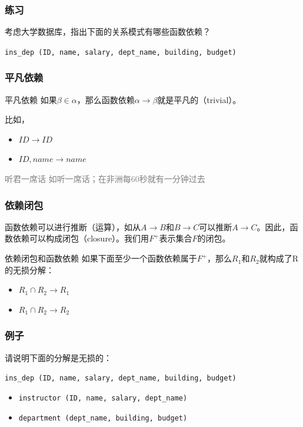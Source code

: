 \documentclass[aspectratio=169, 14pt]{beamer}
\begin{document}
\begin{frame}
    \frametitle{练习}
考虑大学数据库，指出下面的关系模式有哪些函数依赖？

\texttt{ins\_dep (ID, name, salary, dept\_name, building, budget)
}

\end{frame}

\begin{frame}
    \frametitle{平凡依赖}
\begin{exampleblock}{平凡依赖}
如果$\beta \in \alpha$，那么函数依赖$\alpha \rightarrow \beta$就是\alert{平凡的}（trivial）。    
\end{exampleblock}

比如，
\begin{itemize}
    \item $ID \rightarrow ID$
    \item $ID, name \rightarrow name$
\end{itemize}

\textcolor{gray}{听君一席话 如听一席话；在非洲每60秒就有一分钟过去}
\end{frame}

\begin{frame}
    \frametitle{依赖闭包}
函数依赖可以进行推断（运算），如从$A \rightarrow B$和$B \rightarrow C$可以推断$A \rightarrow C$。因此，函数依赖可以构成\alert{闭包}（closure）。我们用$F^+$表示集合$F$的闭包。

\pause
\begin{exampleblock}{依赖闭包和函数依赖}
如果下面至少一个函数依赖属于$F^+$，那么$R_1$和$R_2$就构成了R的无损分解：

\begin{itemize}
    \item $R_1 \cap R_2 \rightarrow R_1$
    \item $R_1 \cap R_2 \rightarrow R_2$
\end{itemize}
\end{exampleblock}

\end{frame}

\begin{frame}
    \frametitle{例子}
请说明下面的分解是无损的：

\texttt{ins\_dep (ID, name, salary, dept\_name, building, budget)
}

\begin{itemize}
    \item \texttt{instructor (ID, name, salary, dept\_name)    }
    \item \texttt{department (dept\_name, building, budget)}
\end{itemize}
    

\end{frame}
\end{document}
